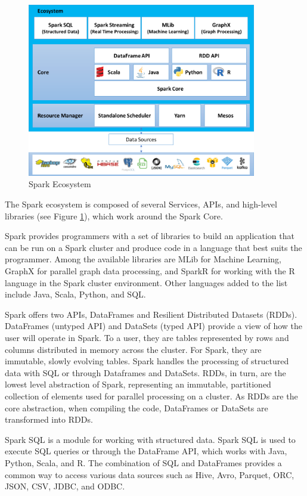 \documentclass[12pt,english]{book}
\begin{document}
\begin{figure}[h]
	\centering
	\includegraphics[width=10cm]{sparkSchema}
	\caption{Spark Ecosystem}
	\label{fig:sparkEcosystem}
\end{figure}

The Spark ecosystem is composed of several Services, APIs, and high-level libraries (see Figure \ref{fig:sparkEcosystem}), which work around the Spark Core.

Spark provides programmers with a set of libraries to build an application that can be run on a Spark cluster and produce code in a language that best suits the programmer.
Among the available libraries are MLib for Machine Learning, GraphX for parallel graph data processing, and SparkR for working with the R language in the Spark cluster environment.
Other languages added to the list include Java, Scala, Python, and SQL.

Spark offers two APIs, DataFrames and Resilient Distributed Datasets (RDDs).
DataFrames (untyped API) and DataSets (typed API) provide a view of how the user will operate in Spark.
To a user, they are tables represented by rows and columns distributed in memory across the cluster.
For Spark, they are immutable, slowly evolving tables.
Spark handles the processing of structured data with SQL or through Dataframes and DataSets.
RDDs, in turn, are the lowest level abstraction of Spark, representing an immutable, partitioned collection of elements used for parallel processing on a cluster.
As RDDs are the core abstraction, when compiling the code, DataFrames or DataSets are transformed into RDDs.

Spark SQL is a module for working with structured data.
Spark SQL is used to execute SQL queries or through the DataFrame API, which works with Java, Python, Scala, and R.
The combination of SQL and DataFrames provides a common way to access various data sources such as Hive, Avro, Parquet, ORC, JSON, CSV, JDBC, and ODBC.
\end{document}
